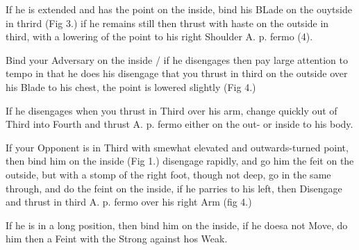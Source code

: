 \newpage


\newpage


\exercise{}
If he is extended and has the point on the inside, bind his BLade on
the ouytside in thrird (Fig 3.) if he remains still then thrust with
haste on the outside in third, with a lowering of the point to his
right Shoulder A. p. fermo (4).

\exercise{}
Bind your Adversary on the inside / if he disengages then pay large
attention to tempo in that he does his disengage that you thrust in
third on the outside over his Blade to his chest, the point is lowered
slightly (Fig 4.)

If he disengages when you thrust in Third over his arm, change quickly
out of Third into Fourth and thrust A. p. fermo either on the out- or
inside to his body.

\exercise{}
If your Opponent is in Third with smewhat elevated and outwards-turned
point, then bind him on the inside (Fig 1.) disengage rapidly, and go
him the feit on the outside, but with a stomp of the right foot,
though not deep, go in the same through, and do the feint on the
inside, if he parries to his left, then Disengage and thrust in third
A. p. fermo over his right Arm (fig 4.)

\exercise{}
If he is in a long position, then bind him on the inside, if he doesa
not Move, do him then a Feint with the Strong against hos Weak.
